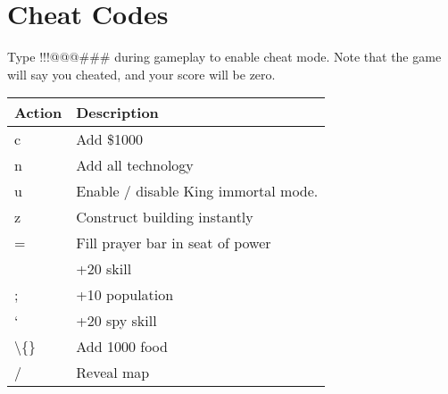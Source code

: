 \section{Cheat Codes}

Type !!!@@@\#\#\# during gameplay to enable cheat mode. Note that the game will say you cheated, and your score will be zero.

\begin{tabular}{ | l | p{6cm} |}
	\hline	 
	Action	& Description \\ \hline
c	& Add \$1000 \\ \hline
n	& Add all technology \\ \hline
u	& Enable / disable King immortal mode. \\ \hline
z	& Construct building instantly \\ \hline
=	& Fill prayer bar in seat of power \\ \hline
[	& +20 combat skill \\ \hline
]	& +20 skill \\ \hline
;	& +10 population \\ \hline
‘	& +20 spy skill \\ \hline
\textbackslash\{\}	& Add 1000 food \\ \hline
/	& Reveal map \\ \hline
	\hline
\end{tabular}

